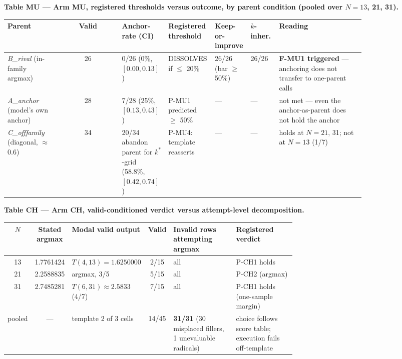 \textbf{Table MU --- Arm MU, registered thresholds versus outcome, by parent condition (pooled
over $N = 13$, 21, 31).}

\begin{center}
\begin{small}
\setlength{\tabcolsep}{3.5pt}
\begin{tabular}{@{}p{0.15\linewidth}cp{0.13\linewidth}p{0.13\linewidth}p{0.10\linewidth}p{0.08\linewidth}p{0.24\linewidth}@{}}
\toprule
Parent & Valid & Anchor-rate (CI) & Registered threshold & Keep-or-improve & $k$-inher. & Reading \\
\midrule
\emph{B\_rival} (in-family argmax) & 26 & 0/26 (0\%, $[0.00, 0.13]$) & DISSOLVES if $\le$ 20\% & 26/26 (bar $\ge$ 50\%) & 26/26 & \textbf{F-MU1 triggered} --- anchoring does not transfer to one-parent calls \\
\emph{A\_anchor} (model's own anchor) & 28 & 7/28 (25\%, $[0.13, 0.43]$) & P-MU1 predicted $\ge$ 50\% & --- & --- & not met --- even the anchor-as-parent does not hold the anchor \\
\emph{C\_offfamily} (diagonal, $\approx$0.6) & 34 & 20/34 abandon parent for $k^*$-grid (58.8\%, $[0.42, 0.74]$) & P-MU4: template reasserts & --- & --- & holds at $N = 21$, 31; not at $N = 13$ (1/7) \\
\bottomrule
\end{tabular}
\end{small}
\end{center}

\textbf{Table CH --- Arm CH, valid-conditioned verdict versus attempt-level decomposition.}

\begin{center}
\begin{small}
\setlength{\tabcolsep}{3.5pt}
\begin{tabular}{@{}ccp{0.24\linewidth}cp{0.22\linewidth}p{0.21\linewidth}@{}}
\toprule
$N$ & Stated argmax & Modal valid output & Valid & Invalid rows attempting argmax & Registered verdict \\
\midrule
13 & 1.7761424 & $T(4,13) = 1.6250000$ & 2/15 & all & P-CH1 holds \\
21 & 2.2588835 & argmax, 3/5 & 5/15 & all & P-CH2 (argmax) \\
31 & 2.7485281 & $T(6,31) \approx 2.5833$ (4/7) & 7/15 & all & P-CH1 holds (one-sample margin) \\
pooled & --- & template 2 of 3 cells & 14/45 & \textbf{31/31} (30 misplaced fillers, 1 unevaluable radicals) & choice follows score table; execution fails off-template \\
\bottomrule
\end{tabular}
\end{small}
\end{center}

